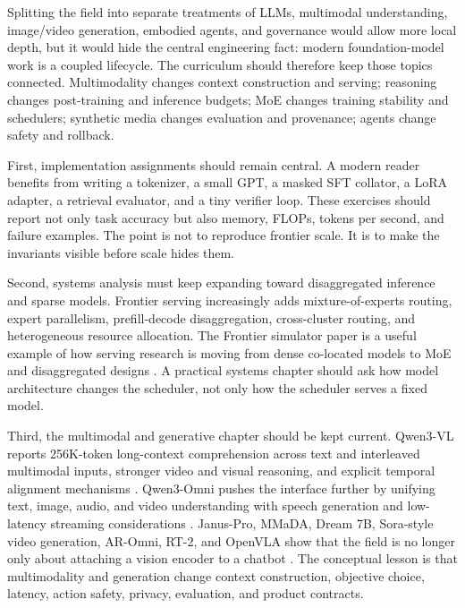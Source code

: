 Splitting the field into separate treatments of LLMs, multimodal understanding, image/video generation, embodied agents, and governance would allow more local depth, but it would hide the central engineering fact: modern foundation-model work is a coupled lifecycle. The curriculum should therefore keep those topics connected. Multimodality changes context construction and serving; reasoning changes post-training and inference budgets; MoE changes training stability and schedulers; synthetic media changes evaluation and provenance; agents change safety and rollback.

First, implementation assignments should remain central. A modern reader benefits from writing a tokenizer, a small GPT, a masked SFT collator, a LoRA adapter, a retrieval evaluator, and a tiny verifier loop. These exercises should report not only task accuracy but also memory, FLOPs, tokens per second, and failure examples. The point is not to reproduce frontier scale. It is to make the invariants visible before scale hides them.

Second, systems analysis must keep expanding toward disaggregated inference and sparse models. Frontier serving increasingly adds mixture-of-experts routing, expert parallelism, prefill-decode disaggregation, cross-cluster routing, and heterogeneous resource allocation. The Frontier simulator paper is a useful example of how serving research is moving from dense co-located models to MoE and disaggregated designs \cite{feng2025frontier}. A practical systems chapter should ask how model architecture changes the scheduler, not only how the scheduler serves a fixed model.

Third, the multimodal and generative chapter should be kept current. Qwen3-VL reports 256K-token long-context comprehension across text and interleaved multimodal inputs, stronger video and visual reasoning, and explicit temporal alignment mechanisms \cite{qwen2025qwen3vl}. Qwen3-Omni pushes the interface further by unifying text, image, audio, and video understanding with speech generation and low-latency streaming considerations \cite{qwen2025qwen3omni}. Janus-Pro, MMaDA, Dream 7B, Sora-style video generation, AR-Omni, RT-2, and OpenVLA show that the field is no longer only about attaching a vision encoder to a chatbot \cite{chen2025januspro,yang2025mmada,ye2025dream7b,openai2024sora,cheng2026aromni,brohan2023rt2,kim2024openvla}. The conceptual lesson is that multimodality and generation change context construction, objective choice, latency, action safety, privacy, evaluation, and product contracts.

